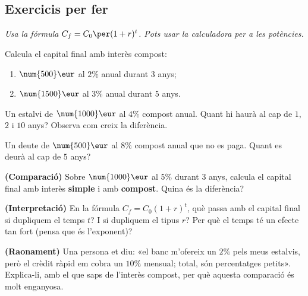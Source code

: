 \subsection{Exercicis per fer}

\noindent\textit{Usa la fórmula $C_f=C_0\per (1+r)^t$. Pots usar la calculadora per a
les potències.}

\begin{exercicis}
\begin{exlist}
  \item Calcula el capital final amb interès compost:
    \begin{enumerate}[label=\alph*), leftmargin=1.6em, topsep=2pt]
      \item $\num{500}\eur$ al $2\%$ anual durant $3$ anys;
      \item $\num{1500}\eur$ al $3\%$ anual durant $5$ anys.
    \end{enumerate}
  \item Un estalvi de $\num{1000}\eur$ al $4\%$ compost anual. Quant hi haurà al cap de
        $1$, $2$ i $10$ anys? Observa com creix la diferència.
  \item Un deute de $\num{500}\eur$ al $8\%$ compost anual que no es paga. Quant es
        deurà al cap de $5$ anys?
  \item \textbf{(Comparació)} Sobre $\num{1000}\eur$ al $5\%$ durant $3$ anys, calcula
        el capital final amb interès \textbf{simple} i amb \textbf{compost}. Quina és
        la diferència?
  \item \textbf{(Interpretació)} En la fórmula $C_f=C_0(1+r)^t$, què passa amb el
        capital final si dupliquem el temps $t$? I si dupliquem el tipus $r$? Per què el
        temps té un efecte tan fort (pensa que és l'exponent)?
  \item \textbf{(Raonament)} Una persona et diu: «el banc m'ofereix un $2\%$ pels meus
        estalvis, però el crèdit ràpid em cobra un $10\%$ mensual; total, són
        percentatges petits». Explica-li, amb el que saps de l'interès compost, per què
        aquesta comparació és molt enganyosa.
\end{exlist}
\end{exercicis}

